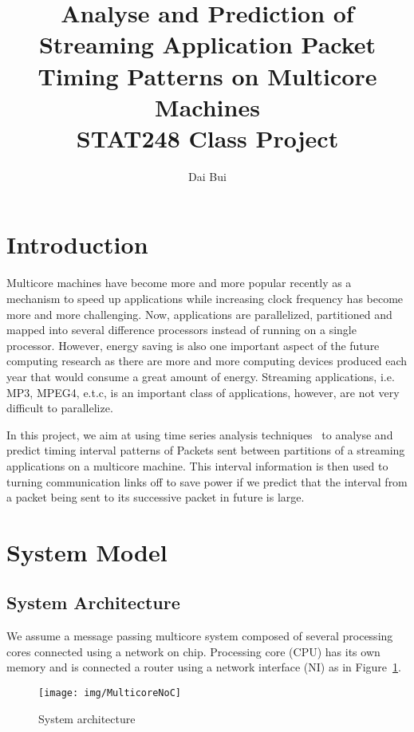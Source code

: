 \documentclass[12pt]{article}
\begin{document}
\title{Analyse and Prediction of Streaming
Application Packet Timing Patterns on Multicore Machines\\
STAT248 Class Project}
\author{Dai Bui}
\maketitle
\section{Introduction}
Multicore machines have become more and more popular recently as a mechanism to
speed up applications while increasing clock frequency has become more and more
challenging. Now, applications are parallelized, partitioned and mapped into
several difference processors instead of running on a single processor. However, energy
saving is also one important aspect of the future computing research as there
are more and more computing devices produced each year that would consume a great
amount of energy. Streaming applications, i.e. MP3, MPEG4, e.t.c, is an
important class of applications, however, are not very difficult to parallelize.

In this project, we aim at using time series analysis
techniques~\cite{BrillingerTimeSeries, ShumwayTimeSeries} to analyse and predict
timing interval patterns of Packets sent between partitions of a streaming
applications on a multicore machine. This interval information is then used to
turning communication links off to save power if we predict that the interval
from a packet being sent to its successive packet in future is large. 

\section{System Model}
\subsection{System Architecture}
We assume a message passing multicore system composed of several processing
cores connected using a network on chip. Processing core (CPU) has its own
memory and is connected a router using a network interface (NI) as in
Figure~\ref{fig:MulticoreNoC}.

\begin{figure}[ht!]
\centering
\texttt{[image: img/MulticoreNoC]}
\caption{System architecture}\label{fig:MulticoreNoC}
\end{figure}
\end{document}
